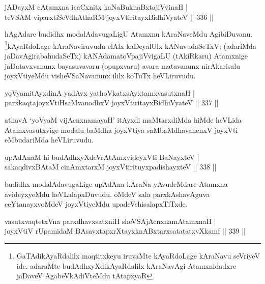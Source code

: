 \begin{shl}
jADayxM cA\s \s tamxna icaCxnitx kaNaBuknaBxtajiVvinaH | \\
teVSAM viparxtiSeVdhAthaRM joyxVtiritayxBidhiVyateV \hfill||  336 ||  
\end{shl}

\begin{artha}
hAgAdare budidhx modalAdavugaLigU Atamxnu kAraNaveMdu AgibiDuvanu. \footnote[1]{GaTAdikAyaRdalilx maqtitxkeyu iruvaMte kAyaRdoLage kAraNavu seVriyeV ide. adaraMte budAdhxyXdikAyaRdalilx kAraNavAgi Atamxnidadxre jaDaveV AgabeVkAdiVteMdu tAtapxyaR}kAyaRdoLage kAraNaviruvudu elAlx kaDeyalUlx kANuvudaSeTxV; (adariMda jaDavAgirabahudaSeTx) kANAdamatoVpajiVvigaLU (tAkiRkaru) Atamxnige jaDatavxvanunx bayasuvavaru (opupxvaru) avara matavanunx nirAkarisalu joyxVtiyeMdu visheVSaNavanunx ililx koTuTx heVLiruvudu.
\end{artha}

\begin{shl}
yoV\s yamitAyxdinA yadAvx yathoVkatxsAyx\s \s tamxvasutxnaH | \\
\footnotemark[2]{}parxkaqtajoyxVtiHsaMvanodhxV joyxVtiritayxBidhiVyateV \hfill||  337 ||  
\end{shl}

\begin{artha}
athavA `yoV\s yaM vijAcnxnamayaH' itAyxdi maMtarxdiMda hiMde heVLida Atamxvasutxvige modalu baMdha joyxVtiya saMbaMdhavanenxV joyxVti eMbudariMda heVLiruvudu.
\end{artha}


\begin{shl}
upAdAnaM hi budAdhxyXdeVrAtAmxvideyxVti BaNayxteV | \\
sakaqdivxBAtaM cinAmxtarxM joyxVtirituyxpadishayxteV \hfill||  338 ||  
\end{shl}

\begin{artha}
budidhx modalAdavugaLige upAdAna kAraNa yAvudeMdare Atamxna avideyxyeMdu heVLalapxDuvudu. oMdeV sala parxkAshavAguva ceYtanayxvoMdeV joyxVtiyeMdu upadeVshisalapxTiTxde.
\end{artha}


\begin{shl}
vasutxvaqtetxVna parxdhavxsatxniH sheVSAjAcnxnamAtamxnaH | \\
joyxVtiV rUpamidaM BAsavxtapxrXtayxknABxtarxsatatatxvXkamf \hfill||  339 ||  
\end{shl}

